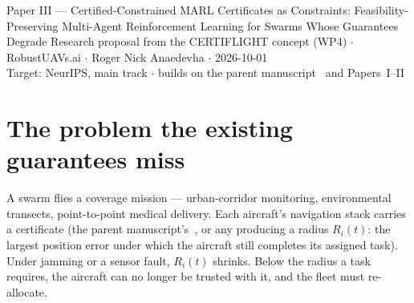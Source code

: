 \documentclass[11pt,a4paper]{article}
\newcommand{\Ri}{R_i}
\begin{document}
\proposalheader
  {Paper III --- Certified-Constrained MARL}
  {Certificates as Constraints: Feasibility-Preserving Multi-Agent Reinforcement
   Learning for Swarms Whose Guarantees Degrade}
  {Research proposal from the CERTIFLIGHT concept (WP4) $\cdot$ RobustUAVs.ai
   $\cdot$ Roger Nick Anaedevha $\cdot$ 2026-10-01\\
   Target: NeurIPS, main track $\cdot$ builds on the parent
   manuscript~\cite{parentpaper} and Papers~I--II}

\begin{abstract}
\noindent
Safe reinforcement learning offers two kinds of guarantee and neither is the one
a safety-critical fleet needs. Lagrangian methods satisfy constraints
\emph{in expectation} over a horizon; barrier and shielding methods give
\emph{pointwise} guarantees but read their constraint sets from hand-specified
margins. We study the case where the constraint set is instead the output of a
formal robustness certificate that is itself \emph{time-varying and
observation-dependent}: each agent carries a certified navigation radius
$\Ri(t)$ that shrinks as the agent is jammed or faulted, and may hold a task only
while $\Ri(t)$ exceeds the radius that task provably requires. This couples a
certificate to a constrained Markov decision process in a way the safe-RL
literature has not analysed, because the feasible set moves as a function of the
observation the policy is still learning to act on. We give three results: a
projection safety layer that preserves pointwise feasibility at every step of
\emph{both learning and deployment} whenever a feasible assignment exists; an
exact, checkable condition for when one exists, via a deficiency form of Hall's
theorem; and a bound on coverage loss as a function of the fraction of agents
whose certificate has collapsed, matching a brute-force oracle in simulation. The
contribution is not a new RL algorithm but a correctness analysis of
certificate-as-constraint, with the certificate taken as an adversarially
moving object rather than a fixed box.
\end{abstract}

\section{The problem the existing guarantees miss}
A swarm flies a coverage mission --- urban-corridor monitoring, environmental
transects, point-to-point medical delivery. Each aircraft's navigation stack
carries a certificate (the parent manuscript's~\cite{parentpaper}, or any
producing a radius $\Ri(t)$: the largest position error under which the aircraft
still completes its assigned task). Under jamming or a sensor fault, $\Ri(t)$
shrinks. Below the radius a task requires, the aircraft can no longer be trusted
with it, and the fleet must re-allocate.
\end{document}

